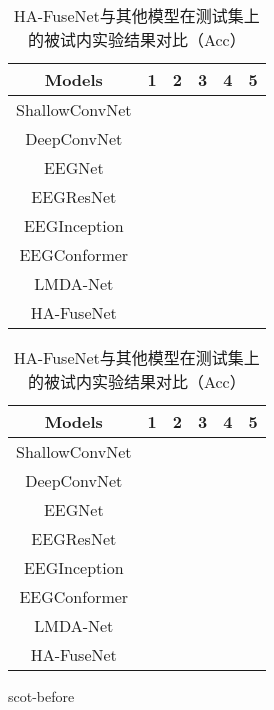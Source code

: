 \begin{table}[ht]
  \centering
  \caption{HA-FuseNet与其他模型在测试集上的被试内实验结果对比（Acc）}
  \label{tab:2acomparecross}
  \begin{tabularx}{\textwidth}{CCCCCC}
    \toprule
    Models & 1 & 2 & 3 & 4 & 5\\
    \midrule
    ShallowConvNet \\
    DeepConvNet \\
    EEGNet \\
    EEGResNet \\
    EEGInception \\
    EEGConformer \\
    LMDA-Net \\
    \midrule 
    HA-FuseNet \\
    \bottomrule
  \end{tabularx}
\end{table}
\begin{table}[ht]
  \centering
  \caption{HA-FuseNet与其他模型在测试集上的被试内实验结果对比（Acc）}
  \label{tab:2acomparecross1}
  \begin{tabularx}{\textwidth}{CCCCCC}
    \toprule
    Models & 1 & 2 & 3 & 4 & 5\\
    \midrule
    ShallowConvNet \\
    DeepConvNet \\
    EEGNet \\
    EEGResNet \\
    EEGInception \\
    EEGConformer \\
    LMDA-Net \\
    \midrule 
    HA-FuseNet \\
    \bottomrule
  \end{tabularx}
\end{table}


scot-before